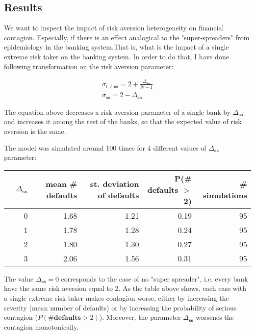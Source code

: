 \documentclass{article}
\begin{document}
\subsection*{Results}

We want to inspect the impact of risk aversion heterogeneity on financial contagion. Especially, if there is an effect analogical to the "super-spreaders" from epidemiology in the banking system.That is, what is the impact of a single extreme risk taker on the banking system. In order to do that, I have done following transformation on the risk aversion parameter:


\begin{equation}
  \begin{aligned}
    \sigma_{i \neq \textbf{ss}} = 2 + \frac{\Delta_{\textbf{ss}}}{N-1} \\ 
    \sigma_{\textbf{ss}} = 2 - \Delta_{\textbf{ss}}
  \end{aligned}
\end{equation}

The equation above decreases a risk aversion parameter of a single bank by $\Delta_{\textbf{ss}}$ and increases it among the rest of the banks, so that the expected value of risk aversion is the same. 

The model was simulated around 100 times for 4 different values of $\Delta_{\textbf{ss}}$ parameter:

\begin{table}[ht]
  \centering
  \begin{tabular}{rrrrrr}
    \hline
   & $\Delta_{\textbf{ss}}$ & mean \# defaults & st. deviation of defaults & P(\# defaults $>$ 2) & \# simulations \\ 
    \hline
 & 0 & 1.68 & 1.21 & 0.19 &  95 \\ 
 & 1 & 1.78 & 1.28 & 0.24 &  95 \\ 
 & 2 & 1.80 & 1.30 & 0.27 &  95 \\ 
 & 3 & 2.06 & 1.56 & 0.31 &  95 \\ 
     \hline
  \end{tabular}
\end{table}

The value $\Delta_{\textbf{ss}} = 0$ corresponds to the case of no "super spreader", i.e. every bank have the same risk aversion equal to 2. As the table above shows, each case with a single extreme risk taker makes contagion worse, either by increasing the severity (mean number of defaults) or by increasing the probability of serious contagion ($P(\textbf{\# defaults} > 2)$). Moreover, the parameter $\Delta_{\textbf{ss}}$ worsenes the contagion monotonically.
\end{document}
